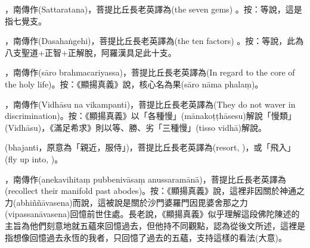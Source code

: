 \startitemgroup[noteitems]
\item{}，南傳作(Sattaratana)，菩提比丘長老英譯為(the seven gems) 。按：等說，這是指七覺支。
\stopitemgroup

\startitemgroup[noteitems]
\item{}，南傳作(Dasahaṅgehi)，菩提比丘長老英譯為(the ten factors) 。按：等說，此為八支聖道+正智+正解脫，阿羅漢具足此十支。
\stopitemgroup

\startitemgroup[noteitems]
\item{}，南傳作(sāro brahmacariyassa)，菩提比丘長老英譯為(In regard to the core of the holy life)。按：《顯揚真義》說，核心名為果(sāro nāma phalaṃ)。
\stopitemgroup

\startitemgroup[noteitems]
\item{}，南傳作(Vidhāsu na vikampanti)，菩提比丘長老英譯為(They do not waver in discrimination)。按：《顯揚真義》以「各種慢」(mānakoṭṭhāsesu)解說「慢類」(Vidhāsu)，《滿足希求》則以等、勝、劣「三種慢」(tisso vidhā)解說。
\stopitemgroup

\startitemgroup[noteitems]
\item{}(bhajanti，原意為「親近，服侍」)，菩提比丘長老英譯為(resort, )，或「飛入」(fly up into, )。
\stopitemgroup

\startitemgroup[noteitems]
\item{}，南傳作(anekavihitaṃ pubbenivāsaṃ anussaramānā)，菩提比丘長老英譯為(recollect their manifold past abodes)。按：《顯揚真義》說，這裡非因關於神通之力(abhiññāvasena)而說，這被說是關於沙門婆羅門因毘婆舍那之力(vipassanāvasena)回憶前世住處。長老說，《顯揚真義》似乎理解這段佛陀陳述的主旨為他們刻意地就五蘊來回憶過去，但他持不同觀點，認為從後文所述，這裡是指想像回憶過去永恆的我者，只回憶了過去的五蘊，支持這樣的看法(大意)。
\stopitemgroup

